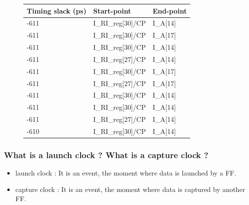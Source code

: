 \documentclass[11pt,a4paper,sans,dvipsnames]{report}
\begin{document}
	\begin{figure}[h!]
		\centering
		\begin{tabular}{lll}
			\hline
			\multicolumn{1}{|l|}{Timing slack (ps)} & \multicolumn{1}{l|}{Start-point}           & \multicolumn{1}{l|}{End-point}    \\ \hline
			\multicolumn{1}{|l|}{-611}              & \multicolumn{1}{l|}{I\_RI\_reg{[}30{]}/CP} & \multicolumn{1}{l|}{I\_A{[}14{]}} \\ \hline
			\multicolumn{1}{|l|}{-611}              & \multicolumn{1}{l|}{I\_RI\_reg{[}30{]}/CP} & \multicolumn{1}{l|}{I\_A{[}17{]}} \\ \hline
			\multicolumn{1}{|l|}{-611}              & \multicolumn{1}{l|}{I\_RI\_reg{[}30{]}/CP} & \multicolumn{1}{l|}{I\_A{[}14{]}} \\ \hline
			\multicolumn{1}{|l|}{-611}              & \multicolumn{1}{l|}{I\_RI\_reg{[}27{]}/CP} & \multicolumn{1}{l|}{I\_A{[}14{]}} \\ \hline
			\multicolumn{1}{|l|}{-611}              & \multicolumn{1}{l|}{I\_RI\_reg{[}30{]}/CP} & \multicolumn{1}{l|}{I\_A{[}17{]}} \\ \hline
			\multicolumn{1}{|l|}{-611}              & \multicolumn{1}{l|}{I\_RI\_reg{[}27{]}/CP} & \multicolumn{1}{l|}{I\_A{[}17{]}} \\ \hline
			\multicolumn{1}{|l|}{-611}              & \multicolumn{1}{l|}{I\_RI\_reg{[}30{]}/CP} & \multicolumn{1}{l|}{I\_A{[}14{]}} \\ \hline
			\multicolumn{1}{|l|}{-611}              & \multicolumn{1}{l|}{I\_RI\_reg{[}30{]}/CP} & \multicolumn{1}{l|}{I\_A{[}14{]}} \\ \hline
			\multicolumn{1}{|l|}{-611}              & \multicolumn{1}{l|}{I\_RI\_reg{[}27{]}/CP} & \multicolumn{1}{l|}{I\_A{[}14{]}} \\ \hline
			\multicolumn{1}{|l|}{-610}              & \multicolumn{1}{l|}{I\_RI\_reg{[}30{]}/CP} & \multicolumn{1}{l|}{I\_A{[}14{]}} \\ \hline
		\end{tabular}
		\label{fig:worst_path}
	\end{figure}

	\subsubsection*{What is a launch clock ? What is a capture clock ?}

	\begin{itemize}
		\item launch clock : It is an event, the moment where data is launched by a FF.
		\item capture clock : It is an event, the moment where data is captured by another FF.
	\end{itemize}
\end{document}
